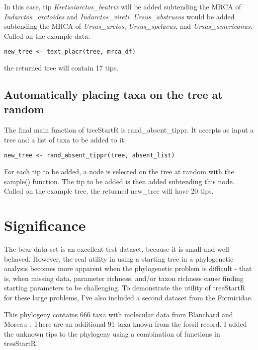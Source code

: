In this case, tip \textit{Kretzoiarctos\_beatrix} will be added subtending the MRCA of \textit{Indarctos\_arctoides} and \textit{Indarctos\_vireti}.
\textit{Ursus\_abstrusus} would be added subtending the MRCA of \textit{Ursus\_arctos}, \textit{Ursus\_spelaeus}, and \textit{Ursus\_americanus}. 
Called on the example data: 

{\tt \begin{snugshade*}
\begin{lstlisting}
new_tree <- text_placr(tree, mrca_df)
\end{lstlisting}
\end{snugshade*}}

the returned tree will contain 17 tips.

\subsection{Automatically placing taxa on the tree at random}

The final main function of treeStartR is rand\_absent\_tippr. 
It accepts as input a tree and a list of taxa to be added to it:

{\tt \begin{snugshade*}
\begin{lstlisting}
new_tree <- rand_absent_tippr(tree, absent_list)
\end{lstlisting}
\end{snugshade*}}

For each tip to be added, a node is selected on the tree at random with the sample() function.
The tip to be added is then added subtending this node.
Called on the example tree, the returned new\_tree will have 20 tips.

\section{Significance}

The bear data set is an excellent test dataset, because it is small and well-behaved.
However, the real utility in using a starting tree in a phylogenetic analysis becomes more apparent when the phylogenetic problem is difficult - that is, when missing data, parameter richness, and/or taxon richness cause finding starting parameters to be challenging.
To demonstrate the utility of treeStartR for these large problems, I've also included a second dataset from the Formicidae. \par

This phylogeny contains 666 taxa with molecular data from Blanchard and Moreau \citeyear{blanchard}. 
There are an additional 91 taxa known from the fossil record.
I added the unknown tips to the phylogeny using a combination of functions in tresStartR. \par

